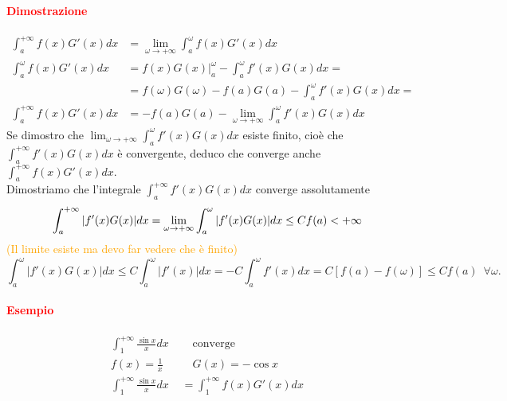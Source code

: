 \documentclass{article}
\begin{document}
\paragraph{\textcolor{red}{Dimostrazione}}
\begin{align*}
    \int_{a}^{+\infty}f(x)G'(x)dx&=\lim_{\omega \rightarrow+\infty}\int_{a}^{\omega}f(x)G'(x)dx \\
    \int_{a}^{\omega}f(x)G'(x)dx&= f(x)G(x)|_{a}^{\omega}-\int_{a}^{\omega}f'(x)G(x)dx=\\
    &=f(\omega)G(\omega)-f(a)G(a)-\int_{a}^{\omega}f'(x)G(x)dx=\\
    \int_{a}^{+\infty}f(x)G'(x)dx&=-f(a)G(a)-\lim_{\omega \rightarrow +\infty}\int_{a}^{\omega}f'(x)G(x)dx
\end{align*}
Se dimostro che $\lim_{\omega \rightarrow +\infty} \int_{a}^{\omega}f'(x)G(x)dx$ esiste finito, cioè che $\int_{a}^{+\infty}f'(x)G(x)dx$ è convergente, deduco che converge anche $\int_{a}^{+\infty}f(x)G'(x)dx$.\\
Dimostriamo che l'integrale $\int_{a}^{+\infty}f'(x)G(x)dx$ converge assolutamente
\begin{equation*}
    \int_{a}^{+\infty}|f'(x)G(x)|dx= \lim_{\omega \rightarrow +\infty}\int_{a}^{\omega} |f'(x)G(x)|dx\leq Cf(a)< +\infty\\
\end{equation*}
\textcolor{orange}{(Il limite esiste ma devo far vedere che è finito)}
\begin{equation*}
    \int_{a}^{\omega}|f'(x)G(x)|dx\leq C\int_{a}^{\omega}|f'(x)|dx= -C\int_{a}^{\omega}f'(x)dx=C[f(a)-f(\omega)]\leq Cf(a)\,\,\, \forall \omega.
\end{equation*}
\begin{flushright}
\large\Lightning
\end{flushright}

\paragraph{\textcolor{red}{Esempio}}
\begin{align*}
    \int_{1}^{+\infty} \frac{\sin x}{x}dx\,\,&\,\,\,\,\,\, \text{converge}\\
    f(x)=\frac{1}{x} \,\,&\,\,\,\,\,\, G(x)=-\cos x\\
    \int_{1}^{+\infty}\frac{\sin x}{x}dx &=\int_{1}^{+\infty} f(x)G'(x)dx\\
\end{align*}
\end{document}
